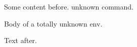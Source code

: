 \documentclass{article}
\begin{document}
Some content before.  unknown command.
\begin{madeupenv}
Body of a totally unknown env.
\end{madeupenv}
Text after.
\end{document}
